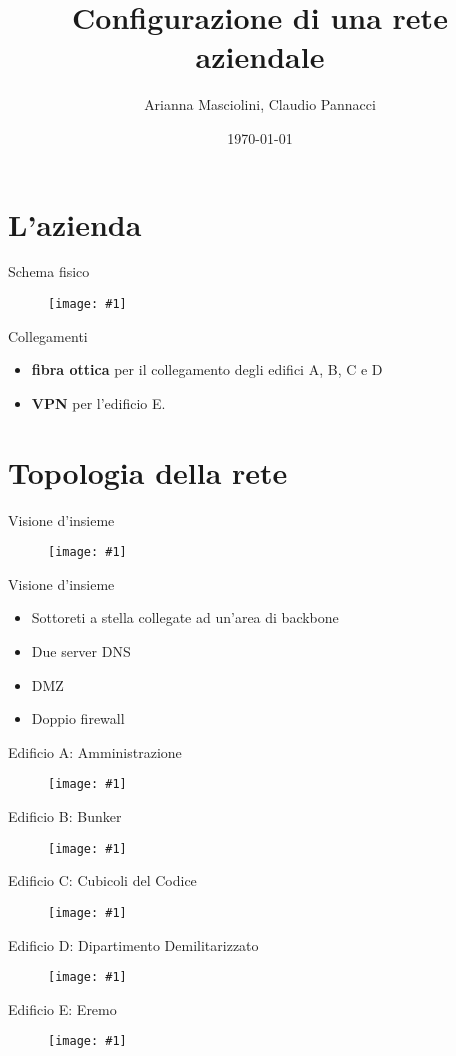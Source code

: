 \documentclass{beamer}
\title{Configurazione di una rete aziendale}
\date{\today}
\author{Arianna Masciolini, Claudio Pannacci}
\institute{Università degli Studi di Perugia}
\def\image[#1][#2]{
  \begin{figure}[H]
  \centering
  \texttt{[image: \#1]}
  \end{figure}}
\begin{document}
  \maketitle
  \section{L'azienda}
  	\begin{frame}{Schema fisico}
    	\image[schema_fisico.png][scale=0.30]
  	\end{frame}
  	\begin{frame}{Collegamenti}
  		\begin{itemize}
  			\item \textbf{fibra ottica} per il collegamento degli edifici A, B, C e D
  			\item \textbf{VPN} per l'edificio E.
  		\end{itemize}
  	\end{frame}
  \section{Topologia della rete}
  	\begin{frame}{Visione d'insieme}
  		\image[schema_logico.png][scale=0.25]
  	\end{frame}
  	\begin{frame}{Visione d'insieme}
  		\begin{itemize}
  			\item Sottoreti a stella collegate ad un'area di backbone
  			\item Due server DNS
  			\item DMZ
  			\item Doppio firewall
  		\end{itemize}
  	\end{frame}
  	\begin{frame}{Edificio A: Amministrazione}
  		\image[ed_a.png][scale=0.50]
  	\end{frame}
  	\begin{frame}{Edificio B: Bunker}
  		\image[ed_b.png][scale=0.50]
  	\end{frame}
  	\begin{frame}{Edificio C: Cubicoli del Codice}
  		\image[ed_c.png][scale=0.50]
  	\end{frame}
  	\begin{frame}{Edificio D: Dipartimento Demilitarizzato}
  		\image[ed_d.png][scale=0.50]
  	\end{frame}
  	\begin{frame}{Edificio E: Eremo}
  		\image[ed_e.png][scale=0.50]
  	\end{frame}
\end{document}
